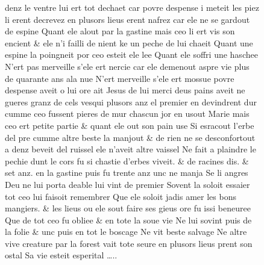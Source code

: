 \documentclass[
  letterpaper,
  DIV=11,
  numbers=noendperiod,
  oneside]{scrreprt}
\begin{document}
\begin{figure}
denz le ventre lui ert tot dechaet car povre despense i meteit les piez
li erent decrevez en plusors lieus erent nafrez car ele ne se gardout de
espine Quant ele alout par la gastine mais ceo li ert vis son encient \&
ele n'i failli de nient ke un peche de lui chaeit Quant une espine la
poingneit por ceo esteit ele lee Quant ele soffri une haschee N'ert pas
merveille s'ele ert nercie car ele demenout aspre vie plus de quarante
ans ala nue N'ert merveille s'ele ert mossue povre despense aveit o lui
ore ait Jesus de lui merci deus pains aveit ne gueres granz de cels
vesqui plusors anz el premier en devindrent dur cumme ceo fussent pieres
de mur chascun jor en usout Marie mais ceo ert petite partie \& quant
ele out son pain use Si esracout l'erbe del pre cumme altre beste la
manjout \& de rien ne se desconfortout a denz beveit del ruissel ele
n'aveit altre vaissel Ne fait a plaindre le pechie dunt le cors fu si
chastie d'erbes viveit. \& de racines dis. \& set anz. en la gastine
puis fu trente anz unc ne manja Se li angres Deu ne lui porta deable lui
vint de premier Sovent la soloit essaier tot ceo lui faisoit remembrer
Que ele soloit jadis amer les bons mangiers. \& les lieus ou ele sout
faire ses gieus ore fu issi beneuree Que de tot ceo fu obliee \& en tote
la soue vie Ne lui sovint puis de la folie \& unc puis en tot le boscage
Ne vit beste salvage Ne altre vive creature par la forest vait tote
seure en plusors lieus prent son ostal Sa vie esteit esperital \ldots..


\end{figure}
\end{document}
